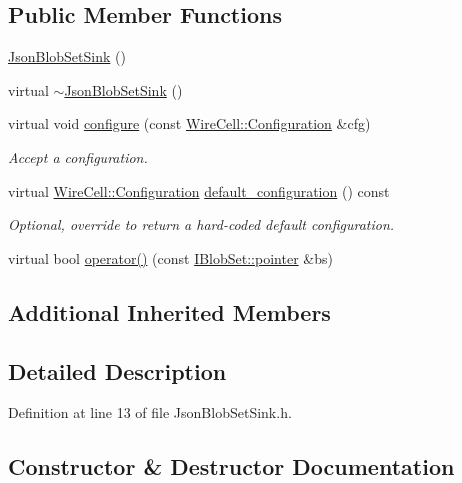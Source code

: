 \subsection*{Public Member Functions}
\begin{DoxyCompactItemize}
\item 
\hyperlink{class_wire_cell_1_1_img_1_1_json_blob_set_sink_a0c17b1a8e9c848b24bd49191d479aaea}{Json\+Blob\+Set\+Sink} ()
\item 
virtual \hyperlink{class_wire_cell_1_1_img_1_1_json_blob_set_sink_a9d642f0b9d4b0985ed862912d7b92a27}{$\sim$\+Json\+Blob\+Set\+Sink} ()
\item 
virtual void \hyperlink{class_wire_cell_1_1_img_1_1_json_blob_set_sink_a333681b98322c16bb80800678386babe}{configure} (const \hyperlink{namespace_wire_cell_a9f705541fc1d46c608b3d32c182333ee}{Wire\+Cell\+::\+Configuration} \&cfg)
\begin{DoxyCompactList}\small\item\em Accept a configuration. \end{DoxyCompactList}\item 
virtual \hyperlink{namespace_wire_cell_a9f705541fc1d46c608b3d32c182333ee}{Wire\+Cell\+::\+Configuration} \hyperlink{class_wire_cell_1_1_img_1_1_json_blob_set_sink_acb989524a514c9d69cd2c6ce523eb2aa}{default\+\_\+configuration} () const
\begin{DoxyCompactList}\small\item\em Optional, override to return a hard-\/coded default configuration. \end{DoxyCompactList}\item 
virtual bool \hyperlink{class_wire_cell_1_1_img_1_1_json_blob_set_sink_ac7d31369d8d48559e66d5fe582a88271}{operator()} (const \hyperlink{class_wire_cell_1_1_i_data_aff870b3ae8333cf9265941eef62498bc}{I\+Blob\+Set\+::pointer} \&bs)
\end{DoxyCompactItemize}
\subsection*{Additional Inherited Members}


\subsection{Detailed Description}


Definition at line 13 of file Json\+Blob\+Set\+Sink.\+h.



\subsection{Constructor \& Destructor Documentation}
\mbox{\label{class_wire_cell_1_1_img_1_1_json_blob_set_sink_a0c17b1a8e9c848b24bd49191d479aaea}} 
